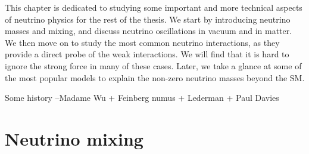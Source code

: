 \graphicspath{{}{theory/}{Diagrams/}}

This chapter is dedicated to studying some important and more technical aspects of neutrino physics for the rest of the thesis. We start by introducing neutrino masses and mixing, and discuss neutrino oscillations in vacuum and in matter. We then move on to study the most common neutrino interactions, as they provide a direct probe of the weak interactions. We will find that it is hard to ignore the strong force in many of these cases. Later, we take a glance at some of the most popular models to explain the non-zero neutrino masses beyond the SM.

Some history --Madame Wu + Feinberg numus + Lederman + Paul Davies 

\section{Neutrino mixing}

